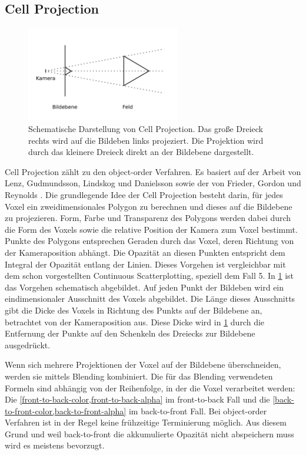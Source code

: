 \documentclass[a4paper,fontsize=12pt,toc=bib,halfparskip,ngerman]{scrartcl}
\begin{document}
\subsection{Cell Projection}
\begin{figure}
	\centering
	\includegraphics[width=0.6\textwidth]{pictures/CellProjection}
	\caption{Schematische Darstellung von Cell Projection. Das gro{\ss}e Dreieck rechts wird auf die Bildeben links projeziert. Die Projektion wird durch das kleinere Dreieck direkt an der Bildebene dargestellt.}
	\label{CellProjection}
\end{figure}
Cell Projection z\"ahlt zu den object-order Verfahren. Es basiert auf der Arbeit von Lenz, Gudmundsson, Lindskog und Danielsson \cite{lenz86display} sowie der von Frieder, Gordon und Reynolds \cite{frieder1985back}. Die grundlegende Idee der Cell Projection besteht darin, f\"ur jedes Voxel ein zweidimensionales Polygon zu berechnen und dieses auf die Bildebene zu projezieren. Form, Farbe und Transparenz des Polygons werden dabei durch die Form des Voxels sowie die relative Position der Kamera zum Voxel bestimmt. Punkte des Polygons entsprechen Geraden durch das Voxel, deren Richtung von der Kameraposition abh\"angt. Die Opazit\"at an diesen Punkten entspricht dem Integral der Opazit\"at entlang der Linien. Dieses Vorgehen ist vergleichbar mit dem schon vorgestellten Continuous Scatterplotting, speziell dem Fall 5. In \cref{CellProjection} ist das Vorgehen schematisch abgebildet. Auf jeden Punkt der Bildeben wird ein eindimensionaler Ausschnitt des Voxels abgebildet. Die L\"ange dieses Ausschnitts gibt die Dicke des Voxels in Richtung des Punkts auf der Bildebene an, betrachtet von der Kameraposition aus. Diese Dicke wird in \cref{CellProjection} durch die Entfernung der Punkte auf den Schenkeln des Dreiecks zur Bildebene ausgedr\"uckt.

Wenn sich mehrere Projektionen der Voxel auf der Bildebene \"uberschneiden, werden sie mittels Blending kombiniert. Die f\"ur das Blending verwendeten Formeln sind abh\"angig von der Reihenfolge, in der die Voxel verarbeitet werden: Die \cref{front-to-back-color,front-to-back-alpha} im front-to-back Fall und die \cref{back-to-front-color,back-to-front-alpha} im back-to-front Fall. Bei object-order Verfahren ist in der Regel keine fr\"uhzeitige Terminierung m\"oglich. Aus diesem Grund und weil back-to-front die akkumulierte Opazit\"at nicht abspeichern muss wird es meistens bevorzugt.
\end{document}
